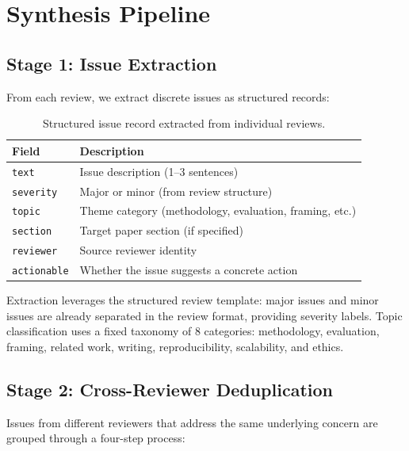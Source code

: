 \section{Synthesis Pipeline}

\subsection{Stage 1: Issue Extraction}

From each review, we extract discrete issues as structured records:

\begin{table}[h]
\centering
\small
\begin{tabular}{ll}
\toprule
Field & Description \\
\midrule
\texttt{text} & Issue description (1--3 sentences) \\
\texttt{severity} & Major or minor (from review structure) \\
\texttt{topic} & Theme category (methodology, evaluation, framing, etc.) \\
\texttt{section} & Target paper section (if specified) \\
\texttt{reviewer} & Source reviewer identity \\
\texttt{actionable} & Whether the issue suggests a concrete action \\
\bottomrule
\end{tabular}
\caption{Structured issue record extracted from individual reviews.}
\end{table}

Extraction leverages the structured review template: major issues and minor issues are already separated in the review format, providing severity labels. Topic classification uses a fixed taxonomy of 8 categories: methodology, evaluation, framing, related work, writing, reproducibility, scalability, and ethics.

\subsection{Stage 2: Cross-Reviewer Deduplication}

Issues from different reviewers that address the same underlying concern are grouped through a four-step process:

